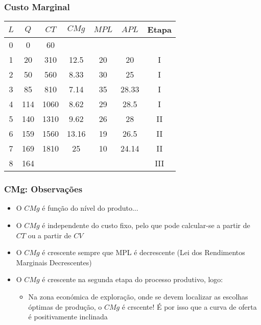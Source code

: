 \begin{frame}
	\frametitle{Custo Marginal}
	\begin{center}
		{
		\renewcommand{\arraystretch}{1.1}
		\begin{tabular}{ccccccc}
			$L$ & $Q$ & $CT$ & $CMg$ & $MPL$ & $APL$ & Etapa \\\hline \hline
			0 & 0 & 60  & & & & \\
			1 & 20 & 310 & 12.5 & 20 & 20 & I \\
			2 & 50 & 560 & 8.33 & 30 & 25 & I \\
			3 & 85 & 810 & 7.14 & 35 & 28.33 & I \\
			4 & 114 & 1060 & 8.62 & 29 & 28.5 & I \\
			5 & 140 & 1310 & 9.62 & 26 & \cellcolor{green!40!white}28 & II \\
			6 & 159 & 1560 & 13.16 & 19 & \cellcolor{green!40!white}26.5 & II \\
			7 & 169 & 1810 & 25 & 10 & \cellcolor{green!40!white}24.14 & II \\
			8 & 164 &  &  &  &  & III
		\end{tabular}
		}
	\end{center}
\end{frame}

\begin{frame}
	\frametitle{CMg: Observa\c c\~oes}
	\begin{itemize}
		\item O $CMg$ \'e fun\c c\~ao do n\'ivel do produto... \pause
		\item O $CMg$ \'e independente do custo fixo, pelo que pode calcular-se a partir de $CT$ ou a partir de $CV$ \pause
		\item O $CMg$ \'e crescente sempre que MPL \'e decrescente (Lei dos Rendimentos Marginais Decrescentes)\pause
		\item O $CMg$ \'e crescente na segunda etapa do processo produtivo, logo: \pause
		\begin{itemize}
			\item Na zona econ\'omica de explora\c c\~ao, onde se devem localizar as escolhas \'optimas de produ\c c\~ao, o $CMg$ \'e crscente! \'E por isso que a curva de oferta \'e positivamente inclinada
		\end{itemize}
	\end{itemize}
\end{frame}

